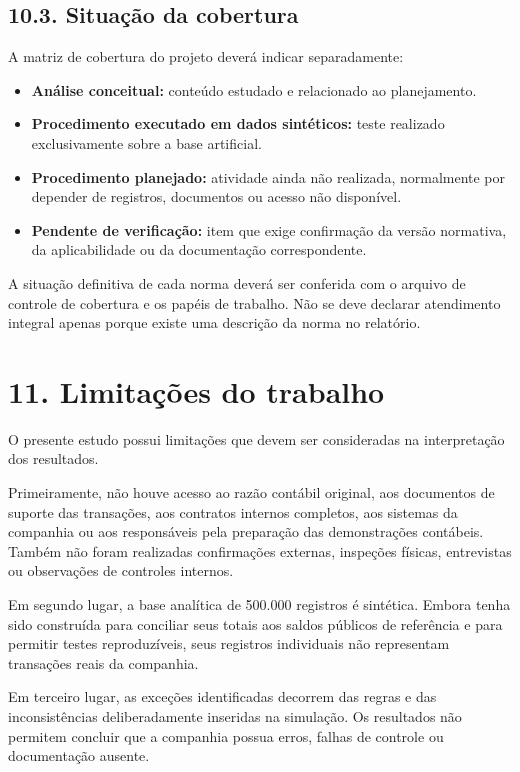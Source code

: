 \documentclass[
]{article}
\providecommand{\tightlist}{%
  \setlength{\itemsep}{0pt}\setlength{\parskip}{0pt}}
\begin{document}
\subsection{10.3. Situação da
cobertura}\label{situauxe7uxe3o-da-cobertura}

A matriz de cobertura do projeto deverá indicar separadamente:

\begin{itemize}
\tightlist
\item
  \textbf{Análise conceitual:} conteúdo estudado e relacionado ao
  planejamento.
\item
  \textbf{Procedimento executado em dados sintéticos:} teste realizado
  exclusivamente sobre a base artificial.
\item
  \textbf{Procedimento planejado:} atividade ainda não realizada,
  normalmente por depender de registros, documentos ou acesso não
  disponível.
\item
  \textbf{Pendente de verificação:} item que exige confirmação da versão
  normativa, da aplicabilidade ou da documentação correspondente.
\end{itemize}

A situação definitiva de cada norma deverá ser conferida com o arquivo
de controle de cobertura e os papéis de trabalho. Não se deve declarar
atendimento integral apenas porque existe uma descrição da norma no
relatório.

\section{11. Limitações do trabalho}\label{limitauxe7uxf5es-do-trabalho}

O presente estudo possui limitações que devem ser consideradas na
interpretação dos resultados.

Primeiramente, não houve acesso ao razão contábil original, aos
documentos de suporte das transações, aos contratos internos completos,
aos sistemas da companhia ou aos responsáveis pela preparação das
demonstrações contábeis. Também não foram realizadas confirmações
externas, inspeções físicas, entrevistas ou observações de controles
internos.

Em segundo lugar, a base analítica de 500.000 registros é sintética.
Embora tenha sido construída para conciliar seus totais aos saldos
públicos de referência e para permitir testes reproduzíveis, seus
registros individuais não representam transações reais da companhia.

Em terceiro lugar, as exceções identificadas decorrem das regras e das
inconsistências deliberadamente inseridas na simulação. Os resultados
não permitem concluir que a companhia possua erros, falhas de controle
ou documentação ausente.
\end{document}
